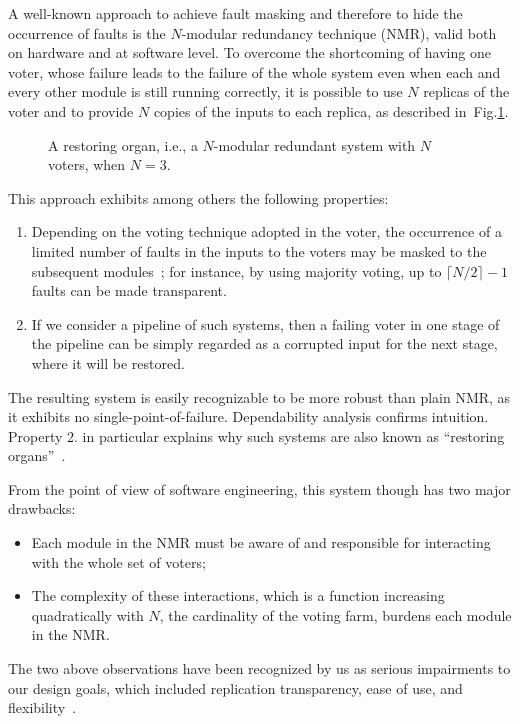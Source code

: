 \documentclass[11pt]{article}
\newcommand{\ceil}[1]{{\lceil{#1}\rceil}}
\begin{document}
A well-known approach to achieve fault masking and therefore
to hide the occurrence of faults is the $N\!$-modular redundancy
technique (NMR), valid both on hardware and at software level.
To overcome the shortcoming of having one voter, whose failure
leads to the failure of the whole system even when each and every
other module is still running correctly, it is possible to use $N$
replicas of the voter and to provide $N$ copies of the inputs
to each replica, as described in~Fig.\ref{ro}.
\begin{figure}
\centerline{}
\caption{A restoring organ, i.e., a $N\!$-modular redundant
system with $N$ voters, when $N=3$.}
\label{ro}
\end{figure}
This approach exhibits among others the following properties:
\begin{enumerate}
\item Depending on the voting technique adopted in the voter,
the occurrence of a limited number of faults in the inputs to the
voters may be masked to the subsequent modules~\cite{LoCE89};
for instance, by using majority voting, up to $\ceil{N/2}-1$ faults can
be made transparent.
\item If we consider a pipeline of such systems, then a failing voter
in one stage of the pipeline can be simply regarded as a corrupted
input for the next stage, where it will be restored.
\end{enumerate}
The resulting system is easily recognizable to be more robust
than plain NMR, as it exhibits no single-point-of-f{}ailure.
Dependability analysis confirms intuition.
Property 2. in particular explains why such systems are
also known as ``restoring organs''~\cite{John89a}.



From the point of view of software engineering, this system 
though has two major drawbacks:
\begin{itemize}
\item Each module in the NMR{} must be aware of and responsible for 
interacting with the whole set of voters;
\item The complexity of these interactions, which is a function increasing
quadratically with $N$, the cardinality of the voting farm, 
burdens each module in the NMR.
\end{itemize}

The two above observations have been recognized by us as serious
impairments to our design goals, which included
replication transparency, ease of use, and flexibility~\cite{DeDL98a}.
\end{document}
